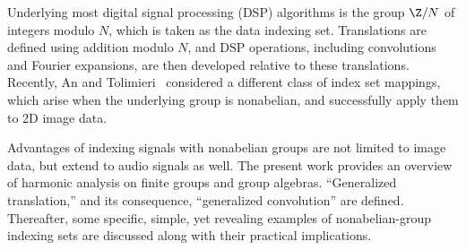 Underlying most digital signal processing (DSP) algorithms
is the group $\Z/N$ of integers modulo $N$, which is
taken as the data indexing set. Translations are defined
using addition modulo $N$, and DSP operations, including
convolutions and Fourier expansions, are then developed
relative to these translations. Recently, An and
Tolimieri~\cite{An:2003} considered a different class of
index set mappings, which arise when the underlying group is
nonabelian, and successfully apply them to 2D image data. 

Advantages of indexing signals with nonabelian groups
are not limited to image data, but extend to audio signals
as well.  
The present work provides an overview of 
harmonic analysis
on finite groups and group algebras. 
``Generalized translation,'' and its consequence, ``generalized
convolution'' are defined.  Thereafter, some specific,
simple, yet revealing examples of nonabelian-group indexing sets 
are discussed along with their practical implications.


